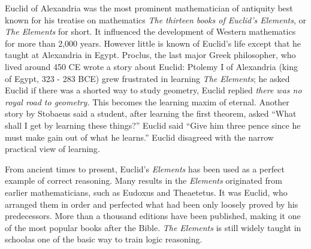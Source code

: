 \documentclass[b5paper]{article}
\begin{document}
\begin{mdframed}

 
Euclid of Alexandria was the most prominent mathematician of antiquity best known for his treatise on mathematics \emph{The thirteen books of Euclid's Elements}, or \emph{The Elements} for short. It influenced the development of Western mathematics for more than 2,000 years. However little is known of Euclid's life except that he taught at Alexandria in Egypt. Proclus, the last major Greek philosopher, who lived around 450 CE wrote a story about Euclid: Ptolemy I of Alexandria (king of Egypt, 323 - 283 BCE) grew frustrated in learning {\em The Elements}; he asked Euclid if there was a shorted way to study geometry, Euclid replied \emph{there was no royal road to geometry.} This becomes the learning maxim of eternal. Another story by Stobaeus said a student, after learning the first theorem, asked \enquote{What shall I get by learning these things?} Euclid said \enquote{Give him three pence since he must make gain out of what he learns.} Euclid disagreed with the narrow practical view of learning\cite{Elements}.

From ancient times to present, Euclid's {\em Elements} has been used as a perfect example of correct reasoning. Many results in the {\em Elements} originated from earlier mathematicians, such as Eudoxus and Theaetetus. It was Euclid, who arranged them in order and perfected what had been only loosely proved by his predecessors. More than a thousand editions have been published, making it one of the most popular books after the Bible. {\em The Elements} is still widely taught in school\footnotemark as one of the basic way to train logic reasoning\cite{HanXueTao16}.
\end{mdframed}
\end{document}

